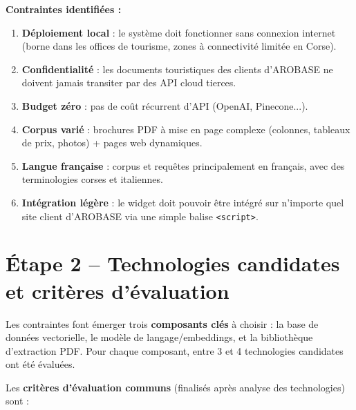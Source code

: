 \documentclass[12pt,a4paper]{report}
\begin{document}
\begin{warningbox}
\textbf{Contraintes identifi\'{e}es :}
\begin{enumerate}[leftmargin=*]
  \item \textbf{D\'{e}ploiement local} : le syst\`{e}me doit fonctionner sans connexion internet
        (borne dans les offices de tourisme, zones \`{a} connectivit\'{e} limit\'{e}e en Corse).
  \item \textbf{Confidentialit\'{e}} : les documents touristiques des clients d'AROBASE ne
        doivent jamais transiter par des API cloud tierces.
  \item \textbf{Budget z\'{e}ro} : pas de coût r\'{e}current d'API (OpenAI, Pinecone...).
  \item \textbf{Corpus vari\'{e}} : brochures PDF \`{a} mise en page complexe (colonnes, tableaux
        de prix, photos) + pages web dynamiques.
  \item \textbf{Langue fran\c{c}aise} : corpus et requ\^{e}tes principalement en fran\c{c}ais,
        avec des terminologies corses et italiennes.
  \item \textbf{Int\'{e}gration l\'{e}g\`{e}re} : le widget doit pouvoir \^{e}tre int\'{e}gr\'{e} sur
        n'importe quel site client d'AROBASE via une simple balise \texttt{<script>}.
\end{enumerate}
\end{warningbox}

\section{\'{E}tape 2 -- Technologies candidates et crit\`{e}res d'\'{e}valuation}

Les contraintes font \'{e}merger trois \textbf{composants cl\'{e}s} \`{a} choisir :
la base de donn\'{e}es vectorielle, le mod\`{e}le de langage/embeddings,
et la biblioth\`{e}que d'extraction PDF. Pour chaque composant, entre 3 et 4 technologies
candidates ont \'{e}t\'{e} \'{e}valu\'{e}es.

Les \textbf{crit\`{e}res d'\'{e}valuation communs} (finalis\'{e}s apr\`{e}s analyse des technologies) sont :
\end{document}
